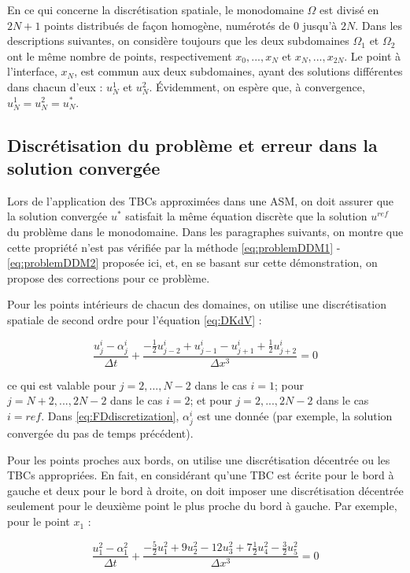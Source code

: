\indent En ce qui concerne la discrétisation spatiale, le monodomaine $\Omega$ est divisé en $2N+1$ points distribués de façon homogène, numérotés de $0$ jusqu'à $2N$. Dans les descriptions suivantes, on considère toujours que les deux subdomaines $\Omega_1$ et $\Omega_2$ ont le même nombre de points, respectivement  $x_0,...,x_N$ et $x_N,...,x_{2N}$. Le point à l'interface, $x_N$, est commun aux deux subdomaines, ayant des solutions différentes dans chacun d'eux : $u_N^1$ et $u_N^2$. Évidemment, on espère que, à convergence, $u_N^1 = u_N^2 = u_N^*$.


\subsection{Discrétisation du problème et erreur dans la solution convergée}

\indent Lors de l'application des TBCs approximées dans une ASM, on doit assurer que la solution convergée $u^*$ satisfait la même équation discrète que la solution $u^{ref}$ du problème dans le monodomaine. Dans les paragraphes suivants, on montre que cette propriété n'est pas vérifiée par la méthode  \eqref{eq:problemDDM1} - \eqref{eq:problemDDM2} proposée ici, et, en se basant sur cette démonstration, on propose des corrections pour ce problème.

\indent Pour les points intérieurs de chacun des domaines, on utilise une discrétisation spatiale de second ordre pour l'équation \eqref{eq:DKdV} :

\begin{equation}
    \label{eq:FDdiscretization}
    \frac{u_j^i - \alpha_j^i}{\Delta t} + \frac{-\frac{1}{2}u_{j-2}^i + u_{j-1}^i - u_{j+1}^i + \frac{1}{2}u_{j+2}^i }{\Delta x ^3} = 0
\end{equation}

\noindent ce qui est valable pour $j=2,...,N-2$ dans le cas $i=1$; pour $j=N+2,...,2N-2$ dans le cas $i=2$; et pour $j=2,...,2N-2$ dans le cas $i=ref$. Dans \eqref{eq:FDdiscretization}, $\alpha_j^i$ est une donnée (par exemple, la solution convergée du pas de temps précédent).

\indent Pour les points proches aux bords, on utilise une discrétisation décentrée ou les TBCs appropriées. En fait, en considérant qu'une TBC est écrite pour le bord à gauche et deux pour le bord à droite, on doit imposer une discrétisation décentrée seulement pour le deuxième point le plus proche du bord à gauche. Par exemple, pour le point $x_1$ : 

\begin{equation*}
    \frac{u_{1}^2 - \alpha_{1}^2}{\Delta t} + \frac{-\frac{5}{2}u_{1}^2 + 9u_{2}^2 - 12 u_{3}^2 + 7\frac{1}{2}u_{4}^2 -\frac{3}{2}u_{5}^2}{\Delta x ^3} = 0
\end{equation*}

